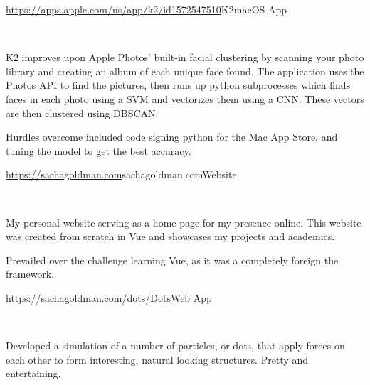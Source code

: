 \documentclass[]{style}
\begin{document}
\begin{entrylist}


\vspace{2mm}

\entry
{\url{https://apps.apple.com/us/app/k2/id1572547510}{K2}}{macOS App}
{ ~ \vspace{-2.5mm}

   

K2 improves upon Apple Photos' built-in facial clustering by scanning your photo library and creating an album of each unique face found. The application uses the Photos API to find the pictures, then runs up python subprocesses which finds faces in each photo using a SVM and vectorizes them using a CNN. These vectors are then clustered using DBSCAN.
\vspace{1mm}

Hurdles overcome included code signing python for the Mac App Store, and tuning the model to get the best accuracy.}


\vspace{2mm}

\entry
{\url{https://sachagoldman.com}{sachagoldman.com}}{Website}
{ ~ \vspace{-2.5mm}

 

My personal website serving as a home page for my presence online. This website was created from scratch in Vue and showcases my projects and academics. 
\vspace{1mm}

Prevailed over the challenge learning Vue, as it was a completely foreign the framework.}



\entry
{\url{https://sachagoldman.com/dots/}{Dots}}{Web App}
{ ~ \vspace{-2.5mm}


Developed a simulation of a number of particles, or dots, that apply forces on each other to form interesting, natural looking structures. Pretty and entertaining.}


\end{entrylist}
\end{document}
